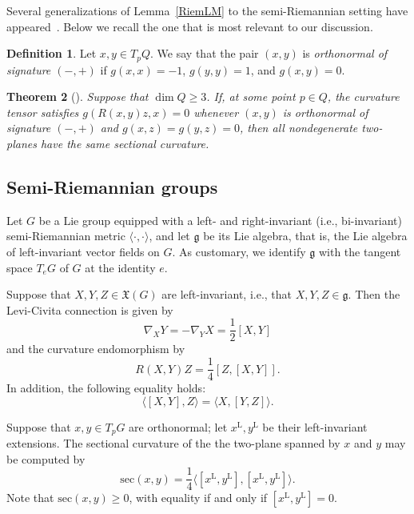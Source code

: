 \documentclass[a4paper,12pt,oneside]{amsart}
\theoremstyle{plain}
\newtheorem{theorem}{Theorem}[section]
\theoremstyle{remark}
\theoremstyle{definition}
\newtheorem{definition}[theorem]{Definition}
\begin{document}
Several generalizations of Lemma~\ref{RiemLM} to the semi-Riemannian setting have appeared~\cite{graves1978, dajczer1980, nomizu1983}. Below we recall the one that is most relevant to our discussion.

\begin{definition}
	Let $x,y \in T_{p}Q$. We say that the pair $(x,y)$ is \textit{orthonormal of signature $(-,+)$} if $g(x,x) =-1$, $g(y,y) =1$, and $g(x,y) =0$.
\end{definition}

\begin{theorem}[{\cite[Theorem~1a]{dajczer1980}}]
	Suppose that $\dim Q \geq 3$. If, at some point $p \in Q$, the curvature tensor satisfies $g(R(x,y)z,x) =0$ whenever $(x,y)$ is orthonormal of signature $(-,+)$ and $g(x,z) = g(y,z) =0$, then all nondegenerate two-planes have the same sectional curvature.
\end{theorem}

\subsection{Semi-Riemannian groups}
Let $G$ be a Lie group equipped with a left- and right-invariant (i.e., bi-invariant) semi-Riemannian metric $\langle \cdot{,}\cdot \rangle$, and let $\mathfrak{g}$ be its Lie algebra, that is, the Lie algebra of left-invariant vector fields on $G$. As customary, we identify $\mathfrak{g}$ with the tangent space $T_{e}G$ of $G$ at the identity $e$.

Suppose that $X, Y, Z \in \mathfrak{X}(G)$ are left-invariant, i.e., that $X,Y,Z \in \mathfrak{g}$. Then the Levi-Civita connection is given by
\begin{equation}\label{EQ2}
	\nabla_{X}Y = -\nabla_{Y}X= \frac{1}{2}[X,Y]
\end{equation}
and the curvature endomorphism by
\begin{equation} \label{curvatureEQ}
	R(X,Y)Z = \frac{1}{4}[Z,[X,Y]].
\end{equation}
In addition, the following equality holds:
\begin{equation}\label{EQ3}
	\langle [X,Y],Z \rangle = \langle X,[Y,Z] \rangle.
\end{equation}

Suppose that $x,y \in T_{p}G$ are orthonormal; let $x^{\mathrm{L}},y^{\mathrm{L}}$ be their left-invariant extensions. The sectional curvature of the the two-plane spanned by $x$ and $y$ may be computed by
\begin{equation*}
	\mathrm{sec}(x,y) =\frac{1}{4} \langle [x^{\mathrm{L}},y^{\mathrm{L}}], [x^{\mathrm{L}},y^{\mathrm{L}}] \rangle.
\end{equation*}
Note that $\mathrm{sec}(x,y) \geq 0$, with equality if and only if $[x^{\mathrm{L}},y^{\mathrm{L}}]=0$.
\end{document}
